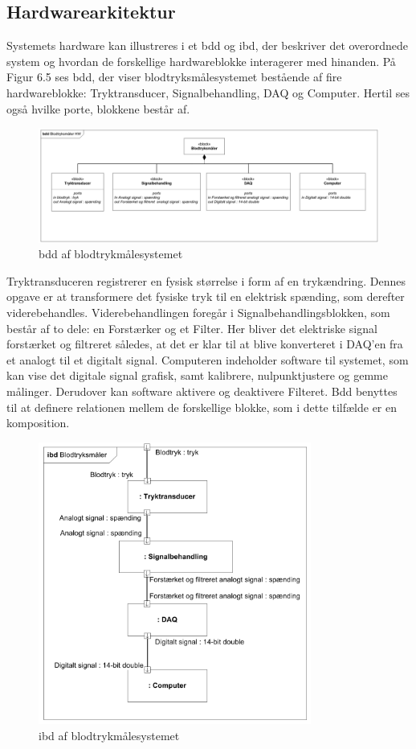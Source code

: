 \subsection{Hardwarearkitektur}
Systemets hardware kan illustreres i et bdd og ibd, der beskriver det overordnede system og hvordan de forskellige hardwareblokke interagerer med hinanden. På Figur 6.5 ses bdd, der viser blodtryksmålesystemet bestående af fire hardwareblokke: Tryktransducer, Signalbehandling, DAQ og Computer. Hertil ses også hvilke porte, blokkene består af.
\begin{figure}[H]
	\centering
	\includegraphics[width=1\textwidth]{Figurer/Snip20151209_70}
	\caption{bdd af blodtrykmålesystemet}
\end{figure}
Tryktransduceren registrerer en fysisk størrelse i form af en trykændring. Dennes opgave er at transformere det fysiske tryk til en elektrisk spænding, som derefter viderebehandles. Viderebehandlingen foregår i Signalbehandlingsblokken, som består af to dele: en Forstærker og et Filter. Her bliver det elektriske signal forstærket og filtreret således, at det er klar til at blive konverteret i DAQ’en fra et analogt til et digitalt signal. Computeren indeholder software til systemet, som kan vise det digitale signal grafisk, samt kalibrere, nulpunktjustere og gemme målinger. Derudover kan software aktivere og deaktivere Filteret.  
Bdd benyttes til at definere relationen mellem de forskellige blokke, som i dette tilfælde er en komposition. 
\begin{figure}[H]
	\centering
	\includegraphics[width=0.8\textwidth]{Figurer/Snip20151209_72}
	\caption{ibd af blodtrykmålesystemet}
\end{figure}
